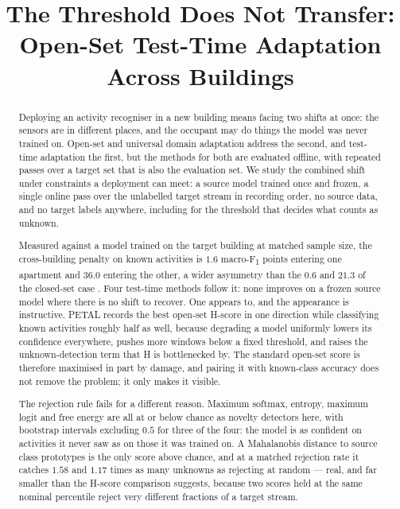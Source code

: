 
\title[mode=title]{The Threshold Does Not Transfer: Open-Set Test-Time Adaptation
Across Buildings}

\begin{abstract}
Deploying an activity recogniser in a new building means facing two shifts at once: the
sensors are in different places, and the occupant may do things the model was never
trained on. Open-set and universal domain adaptation address the second, and test-time
adaptation the first, but the methods for both are evaluated offline, with repeated passes
over a target set that is also the evaluation set. We study the combined shift under
constraints a deployment can meet: a source model trained once and frozen, a single online
pass over the unlabelled target stream in recording order, no source data, and no target
labels anywhere, including for the threshold that decides what counts as unknown.

Measured against a model trained on the target building at matched sample size, the
cross-building penalty on known activities is $1.6$ macro-F\textsubscript{1} points
entering one apartment and $36.0$ entering the other, a wider asymmetry than the
$0.6$ and $21.3$ of the closed-set case \cite{kbaier_closedset}. Four test-time methods
follow it: none improves on a frozen source model where there is no shift to recover.
One appears to, and the appearance is instructive. PETAL records the best open-set
H-score in one direction while classifying known activities roughly half as well, because
degrading a model uniformly lowers its confidence everywhere, pushes more windows below a
fixed threshold, and raises the unknown-detection term that H is bottlenecked by. The
standard open-set score is therefore maximised in part by damage, and pairing it with
known-class accuracy does not remove the problem; it only makes it visible.

The rejection rule fails for a different reason. Maximum softmax, entropy, maximum logit
and free energy are all at or below chance as novelty detectors here, with bootstrap
intervals excluding $0.5$ for three of the four: the model is as confident on activities it
never saw as on those it was trained on. A Mahalanobis distance to source class prototypes
is the only score above chance, and at a matched rejection rate it catches $1.58$ and
$1.17$ times as many unknowns as rejecting at random --- real, and far smaller than the
H-score comparison suggests, because two scores held at the same nominal percentile reject
very different fractions of a target stream.


\end{abstract}
